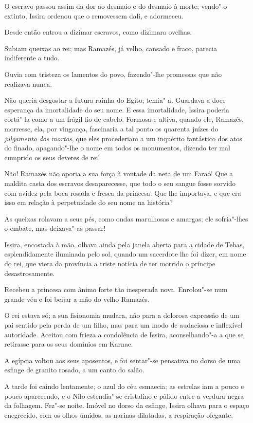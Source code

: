 O escravo passou assim da dor ao desmaio e do desmaio à morte; vendo"-o
extinto, Issira ordenou que o removessem dali, e adormeceu.

Desde então entrou a dizimar escravos, como dizimara ovelhas.

Subiam queixas ao rei; mas Ramazés, já velho, cansado e fraco, parecia
indiferente a tudo.

Ouvia com tristeza os lamentos do povo, fazendo"-lhe promessas que não
realizava nunca.

Não queria desgostar a futura rainha do Egito; temia"-a. Guardava a doce
esperança da imortalidade do seu nome. E essa imortalidade, Issira
poderia cortá"-la como a um frágil fio de cabelo. Formosa e altiva,
quando ele, Ramazés, morresse, ela, por vingança, fascinaria a tal ponto
os quarenta juízes do \emph{julgamento dos mortos}, que eles procederiam
a um inquérito fantástico dos atos do finado, apagando"-lhe o nome em
todos os monumentos, dizendo ter mal cumprido os seus deveres de rei!

Não! Ramazés não oporia a sua força à vontade da neta de um Faraó! Que a
maldita casta dos escravos desaparecesse, que todo o seu sangue fosse
sorvido com avidez pela boca rosada e fresca da princesa. Que lhe
importava, e que era isso em relação à perpetuidade do seu nome na
história?

As queixas rolavam a seus pés, como ondas marulhosas e amargas; ele
sofria"-lhes o embate, mas deixava"-as passar!

Issira, encostada à mão, olhava ainda pela janela aberta para a cidade
de Tebas, esplendidamente iluminada pelo sol, quando um sacerdote lhe
foi dizer, em nome do rei, que viera da província a triste notícia de
ter morrido o príncipe desastrosamente.

Recebeu a princesa com ânimo forte tão inesperada nova. Enrolou"-se num
grande véu e foi beijar a mão do velho Ramazés.

O rei estava só; a sua fisionomia mudara, não para a dolorosa expressão
de um pai sentido pela perda de um filho, mas para um modo de audaciosa
e inflexível autoridade. Aceitou com frieza a condolência de Issira,
aconselhando"-a a que se retirasse para os seus domínios em Karnac.

A egípcia voltou aos seus aposentos, e foi sentar"-se pensativa no dorso
de uma esfinge de granito rosado, a um canto do salão.

A tarde foi caindo lentamente; o azul do céu esmaecia; as estrelas iam a
pouco e pouco aparecendo, e o Nilo estendia"-se cristalino e pálido entre
a verdura negra da folhagem. Fez"-se noite. Imóvel no dorso da esfinge,
Issira olhava para o espaço enegrecido, com os olhos úmidos, as narinas
dilatadas, a respiração ofegante.

